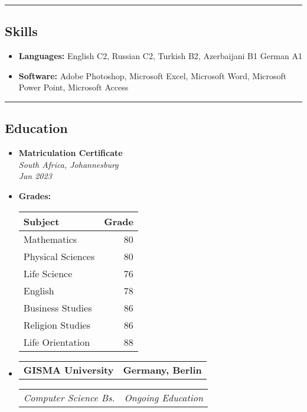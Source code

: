 \documentclass[11pt,letterpaper]{article}
\makeatletter
\newcommand{\headerrow}[2]
{\begin{tabular*}{\linewidth}{l@{\extracolsep{\fill}}r}
#1 &
#2 \\
\end{tabular*}}
\makeatother
\begin{document}
\hrule
\vspace{-1em}
\subsection*{\Large Skills}

\begin{itemize}[leftmargin=1em,noitemsep]
	\item \textbf{Languages:}
	      English C2, Russian C2, Turkish B2, Azerbaijani B1 German A1
	\item \textbf{Software:}
	      Adobe Photoshop, Microsoft Excel, Microsoft Word, Microsoft Power Point, Microsoft Access
\end{itemize}

\hrule
\vspace{-1em}
\subsection*{\Large Education}

\begin{itemize}[leftmargin=1em]
    \parskip=0.1em
    
    \item
    \textbf{Matriculation Certificate} \\
    \emph{South Africa, Johannesburg} \\
    \emph{Jan 2023}
    
    \item
    \textbf{Grades:} \\
    \begin{tabular}{|l|r|}
        \hline
        \textbf{Subject} & \textbf{Grade} \\
        \hline
        Mathematics & 80 \\
        Physical Sciences & 80 \\
        Life Science & 76 \\
        English & 78 \\
        Business Studies & 86 \\
        Religion Studies & 86 \\
        Life Orientation & 88 \\
        \hline
    \end{tabular}
	      	      
\end{itemize}

\begin{itemize}[leftmargin=1em]
	\parskip=0.1em
		
	\item
	      \headerrow
	      {\textbf{GISMA University}}
	      {\textbf{Germany, Berlin}}
	      \headerrow
	      {\emph{Computer Science Bs.}}
	      {\emph{Ongoing Education}}
	      	      
\end{itemize}
\end{document}
